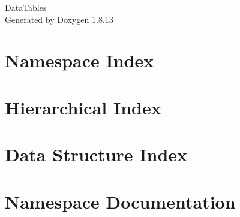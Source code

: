 \documentclass[twoside]{book}
\newcommand{\+}{\discretionary{\mbox{\scriptsize$\hookleftarrow$}}{}{}}
\newcommand{\clearemptydoublepage}{%
  \newpage{\pagestyle{empty}\cleardoublepage}%
}
\begin{document}
\hypersetup{pageanchor=false,
             bookmarksnumbered=true,
             pdfencoding=unicode
            }
\begin{titlepage}
\vspace*{7cm}
\begin{center}%
{\Large Data\+Tables }\\
\vspace*{1cm}
{\large Generated by Doxygen 1.8.13}\\
\end{center}
\end{titlepage}
\clearemptydoublepage
{}
\tableofcontents
\clearemptydoublepage
{}
\hypersetup{pageanchor=true}

\chapter{Namespace Index}

\chapter{Hierarchical Index}

\chapter{Data Structure Index}

\chapter{Namespace Documentation}

\end{document}
